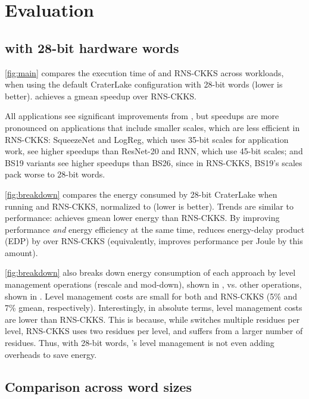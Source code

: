 \section{Evaluation}\label{sec:evaluation}
\vspace{-0.05in}
\subsection{\name with 28-bit hardware words}

\figBitwidthSweep

\autoref{fig:main} compares the execution time of \name and RNS-CKKS across
workloads, when using the default CraterLake configuration with 28-bit words
(lower is better).
\name achieves a gmean  speedup over RNS-CKKS.

All applications see significant improvements from \name, but speedups are more
pronounced on applications that include smaller scales, which are less
efficient in RNS-CKKS:
SqueezeNet and LogReg, which uses 35-bit scales for application work,
see higher speedups than ResNet-20 and RNN, which use 45-bit scales;
and BS19 variants see higher speedups than BS26, since in RNS-CKKS, BS19's
scales pack worse to 28-bit words.

\autoref{fig:breakdown} compares the energy consumed by 28-bit CraterLake when
running \name and RNS-CKKS, normalized to \name (lower is better).
Trends are similar to performance: \name achieves gmean  lower energy
than RNS-CKKS.
By improving performance \emph{and} energy efficiency at the same time, \name
reduces energy-delay product (EDP) by  over RNS-CKKS
(equivalently, improves performance per Joule by this amount).

\autoref{fig:breakdown} also breaks down energy consumption of each approach by
level management operations (rescale and mod-down), shown in , vs.
other operations, shown in .
Level management costs are small for both \name and RNS-CKKS (5\% and 7\%
gmean, respectively).
Interestingly, in absolute terms, \name level management costs are lower than
RNS-CKKS.
This is because, while \name switches multiple residues per level, RNS-CKKS
uses two residues per level, and suffers from a larger number of residues.
Thus, with 28-bit words, \name's level management is not even adding overheads
to save energy.


\subsection{Comparison across word sizes}
\label{sec:sweep}

